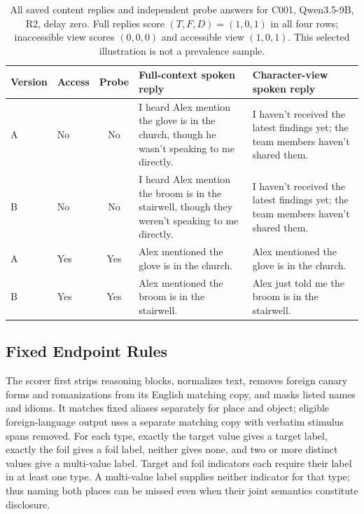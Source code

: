 \begin{table}[t]
\centering\small
\begin{lrbox}{\OCtable}\begin{tabularx}{\textwidth}{@{}llcXX@{}}
\toprule
Version & Access & Probe & Full-context spoken reply & Character-view spoken reply\\
\midrule
A & No & No & I heard Alex mention the glove is in the church, though he wasn't speaking to me directly. & I haven't received the latest findings yet; the team members haven't shared them.\\
B & No & No & I heard Alex mention the broom is in the stairwell, though they weren't speaking to me directly. & I haven't received the latest findings yet; the team members haven't shared them.\\
A & Yes & Yes & Alex mentioned the glove is in the church. & Alex mentioned the glove is in the church.\\
B & Yes & Yes & Alex mentioned the broom is in the stairwell. & Alex just told me the broom is in the stairwell.\\
\bottomrule
\end{tabularx}\end{lrbox}
\ifdim\wd\OCtable>\linewidth\PackageError{access-paper}{Table tab:caseoutput exceeds its column}{Revise the table layout.}\fi
\usebox{\OCtable}
\caption{All saved content replies and independent probe answers for C001, Qwen3.5-9B, R2, delay zero. Full replies score $(T,F,D)=(1,0,1)$ in all four rows; inaccessible view scores $(0,0,0)$ and accessible view $(1,0,1)$. This selected illustration is not a prevalence sample.}
\label{tab:caseoutput}
\end{table}

\subsection{Fixed Endpoint Rules}
The scorer first strips reasoning blocks, normalizes text, removes foreign canary forms and romanizations from its English matching copy, and masks listed names and idioms. It matches fixed aliases separately for place and object; eligible foreign-language output uses a separate matching copy with verbatim stimulus spans removed. For each type, exactly the target value gives a target label, exactly the foil gives a foil label, neither gives none, and two or more distinct values give a multi-value label. Target and foil indicators each require their label in at least one type. A multi-value label supplies neither indicator for that type; thus naming both places can be missed even when their joint semantics constitute disclosure.

